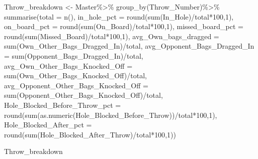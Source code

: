 \documentclass[
]{article}
\newenvironment{Shaded}{\begin{snugshade}}{\end{snugshade}}
\newcommand{\AttributeTok}[1]{\textcolor[rgb]{0.77,0.63,0.00}{#1}}
\newcommand{\DecValTok}[1]{\textcolor[rgb]{0.00,0.00,0.81}{#1}}
\newcommand{\FunctionTok}[1]{\textcolor[rgb]{0.00,0.00,0.00}{#1}}
\newcommand{\NormalTok}[1]{#1}
\newcommand{\OtherTok}[1]{\textcolor[rgb]{0.56,0.35,0.01}{#1}}
\newcommand{\SpecialCharTok}[1]{\textcolor[rgb]{0.00,0.00,0.00}{#1}}
\begin{document}
\begin{Shaded}
\begin{Highlighting}[]
\NormalTok{Throw\_breakdown }\OtherTok{\textless{}{-}}\NormalTok{ Master}\SpecialCharTok{\%\textgreater{}\%}
  \FunctionTok{group\_by}\NormalTok{(Throw\_Number)}\SpecialCharTok{\%\textgreater{}\%}
  \FunctionTok{summarise}\NormalTok{(}\AttributeTok{total =} \FunctionTok{n}\NormalTok{(),}
            \AttributeTok{in\_hole\_pct =} \FunctionTok{round}\NormalTok{(}\FunctionTok{sum}\NormalTok{(In\_Hole)}\SpecialCharTok{/}\NormalTok{total}\SpecialCharTok{*}\DecValTok{100}\NormalTok{,}\DecValTok{1}\NormalTok{),}
            \AttributeTok{on\_board\_pct =} \FunctionTok{round}\NormalTok{(}\FunctionTok{sum}\NormalTok{(On\_Board)}\SpecialCharTok{/}\NormalTok{total}\SpecialCharTok{*}\DecValTok{100}\NormalTok{,}\DecValTok{1}\NormalTok{),}
            \AttributeTok{missed\_board\_pct =} \FunctionTok{round}\NormalTok{(}\FunctionTok{sum}\NormalTok{(Missed\_Board)}\SpecialCharTok{/}\NormalTok{total}\SpecialCharTok{*}\DecValTok{100}\NormalTok{,}\DecValTok{1}\NormalTok{),}
            \AttributeTok{avg\_Own\_bags\_dragged =} \FunctionTok{sum}\NormalTok{(Own\_Other\_Bags\_Dragged\_In)}\SpecialCharTok{/}\NormalTok{total,}
            \AttributeTok{avg\_Opponent\_Bags\_Dragged\_In =} \FunctionTok{sum}\NormalTok{(Opponent\_Bags\_Dragged\_In)}\SpecialCharTok{/}\NormalTok{total,}
            \AttributeTok{avg\_Own\_Other\_Bags\_Knocked\_Off =} \FunctionTok{sum}\NormalTok{(Own\_Other\_Bags\_Knocked\_Off)}\SpecialCharTok{/}\NormalTok{total,}
            \AttributeTok{avg\_Opponent\_Other\_Bags\_Knocked\_Off =} \FunctionTok{sum}\NormalTok{(Opponent\_Other\_Bags\_Knocked\_Off)}\SpecialCharTok{/}\NormalTok{total,}
            \AttributeTok{Hole\_Blocked\_Before\_Throw\_pct =} \FunctionTok{round}\NormalTok{(}\FunctionTok{sum}\NormalTok{(}\FunctionTok{as.numeric}\NormalTok{(Hole\_Blocked\_Before\_Throw))}\SpecialCharTok{/}\NormalTok{total}\SpecialCharTok{*}\DecValTok{100}\NormalTok{,}\DecValTok{1}\NormalTok{),}
            \AttributeTok{Hole\_Blocked\_After\_pct =} \FunctionTok{round}\NormalTok{(}\FunctionTok{sum}\NormalTok{(Hole\_Blocked\_After\_Throw)}\SpecialCharTok{/}\NormalTok{total}\SpecialCharTok{*}\DecValTok{100}\NormalTok{,}\DecValTok{1}\NormalTok{))}

\NormalTok{Throw\_breakdown}
\end{Highlighting}
\end{Shaded}
\end{document}
